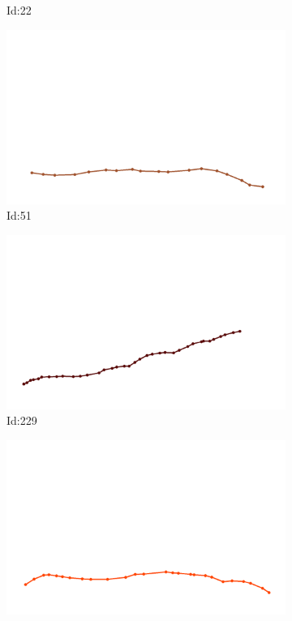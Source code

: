 \documentclass[12pt,twoside]{report}
\begin{document}
\begin{figure}
\begin{subfigure}[b]{0.20\textwidth}
\caption{Id:22}
\end{subfigure}
\begin{subfigure}[b]{0.20\textwidth}
\centering
\includegraphics[width=\textwidth]{../trajectories/51.png}
\caption{Id:51}
\end{subfigure}
\begin{subfigure}[b]{0.20\textwidth}
\centering
\includegraphics[width=\textwidth]{../trajectories/229.png}
\caption{Id:229}
\end{subfigure}
\begin{subfigure}[b]{0.20\textwidth}
\centering
\includegraphics[width=\textwidth]{../trajectories/265.png}

\end{subfigure}
\end{figure}
\end{document}
